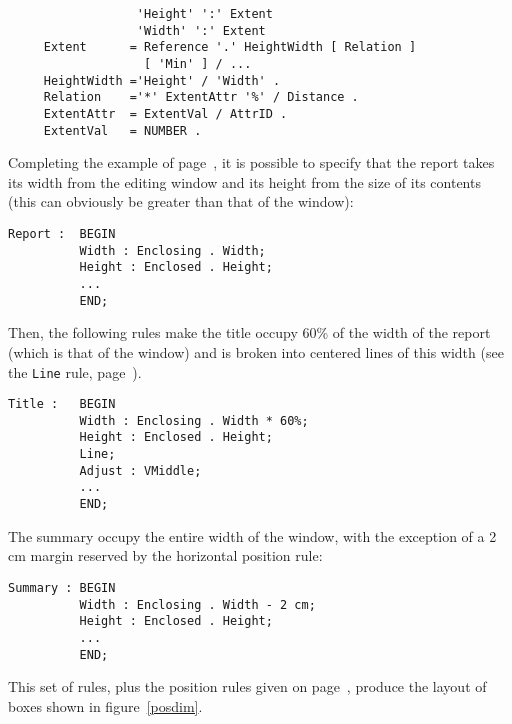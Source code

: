 \begin{verbatim}
                  'Height' ':' Extent
                  'Width' ':' Extent
     Extent      = Reference '.' HeightWidth [ Relation ]
                   [ 'Min' ] / ...
     HeightWidth ='Height' / 'Width' .
     Relation    ='*' ExtentAttr '%' / Distance .
     ExtentAttr  = ExtentVal / AttrID .
     ExtentVal   = NUMBER .
\end{verbatim}

\begin{example}
Completing the example of page~\pageref{expos1}, it is possible to
specify that the report takes its width from the editing window and
its height from the size of its contents (this can obviously be
greater than that of the window):

\begin{verbatim}
Report :  BEGIN
          Width : Enclosing . Width;
          Height : Enclosed . Height;
          ...
          END;
\end{verbatim}
Then, the following rules make the title occupy 60\% of the width of
the report (which is that of the window) and is broken into centered
lines of this width (see the {\tt Line} rule, page~\pageref{regleline}).

\begin{verbatim}
Title :   BEGIN
          Width : Enclosing . Width * 60%;
          Height : Enclosed . Height;
          Line;
          Adjust : VMiddle;
          ...
          END;
\end{verbatim}
The summary occupy the entire width of the window, with the exception
of a 2 cm margin reserved by the horizontal position rule:

\begin{verbatim}
Summary : BEGIN
          Width : Enclosing . Width - 2 cm;
          Height : Enclosed . Height;
          ...
          END;
\end{verbatim}
This set of rules, plus the position rules given on
page~\pageref{exemplerapp}, produce the layout of boxes shown in
figure~\ref{posdim}.


\end{example}
